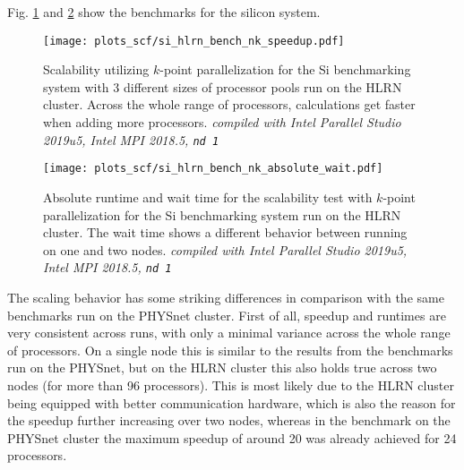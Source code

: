 \documentclass[main.tex]{subfiles}
\begin{document}
Fig. \ref{fig:scaling_scf_hlrn_nk_si_speedup} and \ref{fig:scaling_scf_hlrn_nk_si_absolute_wait} show the benchmarks for the silicon system.
\begin{figure}
\centering
\texttt{[image: plots\_scf/si\_hlrn\_bench\_nk\_speedup.pdf]}
\caption{Scalability utilizing \(k\)-point parallelization for the Si benchmarking system with 3 different sizes of processor pools run on the HLRN cluster. Across the whole range of processors, calculations get faster when adding more processors. \emph{\QE compiled with Intel Parallel Studio 2019u5, Intel MPI 2018.5, \texttt{nd 1}}}
\label{fig:scaling_scf_hlrn_nk_si_speedup}
\end{figure}

\begin{figure}
    \centering
    \texttt{[image: plots\_scf/si\_hlrn\_bench\_nk\_absolute\_wait.pdf]}
\caption{Absolute runtime and wait time for the scalability test with \(k\)-point parallelization for the Si benchmarking system run on the HLRN cluster. The wait time shows a different behavior between running on one and two nodes. \emph{\QE compiled with Intel Parallel Studio 2019u5, Intel MPI 2018.5, \texttt{nd 1}}}
\label{fig:scaling_scf_hlrn_nk_si_absolute_wait}
\end{figure}
The scaling behavior has some striking differences in comparison with the same benchmarks run on the PHYSnet cluster.
First of all, speedup and runtimes are very consistent across runs, with only a minimal variance across the whole range of processors.
On a single node this is similar to the results from the benchmarks run on the PHYSnet, but on the HLRN cluster this also holds true across two nodes (for more than 96 processors).
This is most likely due to the HLRN cluster being equipped with better communication hardware, which is also the reason for the speedup further increasing over two nodes, whereas in the benchmark on the PHYSnet cluster the maximum speedup of around 20 was already achieved for 24 processors.

\end{document}

